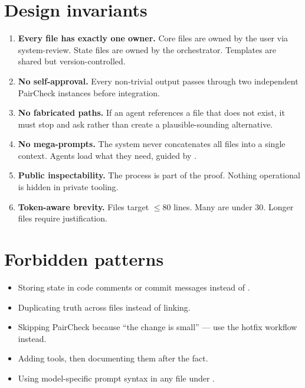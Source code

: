 \documentclass[a4paper,11pt,openany]{report}
\begin{document}

\section{Design invariants}

\begin{enumerate}
  \item \textbf{Every file has exactly one owner.} Core files are owned by the
    user via system-review. State files are owned by the orchestrator. Templates
    are shared but version-controlled.
  \item \textbf{No self-approval.} Every non-trivial output passes through two
    independent PairCheck instances before integration.
  \item \textbf{No fabricated paths.} If an agent references a file that does
    not exist, it must stop and ask rather than create a plausible-sounding
    alternative.
  \item \textbf{No mega-prompts.} The system never concatenates all files into a
    single context. Agents load what they need, guided by .
  \item \textbf{Public inspectability.} The process is part of the proof. Nothing
    operational is hidden in private tooling.
  \item \textbf{Token-aware brevity.} Files target $\leq 80$ lines. Many are
    under 30. Longer files require justification.
\end{enumerate}

\section{Forbidden patterns}

\begin{itemize}
  \item Storing state in code comments or commit messages instead of
    .
  \item Duplicating truth across files instead of linking.
  \item Skipping PairCheck because ``the change is small'' --- use the hotfix
    workflow instead.
  \item Adding tools, then documenting them after the fact.
  \item Using model-specific prompt syntax in any file under .
\end{itemize}
\end{document}
